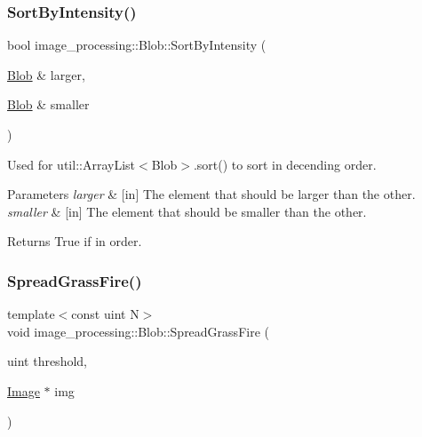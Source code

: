 \subsubsection{\texorpdfstring{Sort\+By\+Intensity()}{SortByIntensity()}}
{\footnotesize\ttfamily bool image\+\_\+processing\+::\+Blob\+::\+Sort\+By\+Intensity (\begin{DoxyParamCaption}\item[{\hyperlink{classimage__processing_1_1Blob}{Blob} \&}]{larger,  }\item[{\hyperlink{classimage__processing_1_1Blob}{Blob} \&}]{smaller }\end{DoxyParamCaption})\hspace{0.3cm}{\ttfamily [static]}}



Used for util\+::\+Array\+List$<$\+Blob$>$.\+sort() to sort in decending order. 


\begin{DoxyParams}{Parameters}
{\em larger} & \mbox{[}in\mbox{]} The element that should be larger than the other. \\
\hline
{\em smaller} & \mbox{[}in\mbox{]} The element that should be smaller than the other. \\
\hline
\end{DoxyParams}
\begin{DoxyReturn}{Returns}
True if in order. 
\end{DoxyReturn}
\mbox{\label{classimage__processing_1_1Blob_ae51f78c334cd1c1fe415c2a989a7f5bd}} 
\subsubsection{\texorpdfstring{Spread\+Grass\+Fire()}{SpreadGrassFire()}}
{\footnotesize\ttfamily template$<$const uint N$>$ \\
void image\+\_\+processing\+::\+Blob\+::\+Spread\+Grass\+Fire (\begin{DoxyParamCaption}\item[{uint}]{threshold,  }\item[{\hyperlink{classimage__processing_1_1Image}{Image} $\ast$}]{img }\end{DoxyParamCaption})\hspace{0.3cm}{\ttfamily [inline]}}



